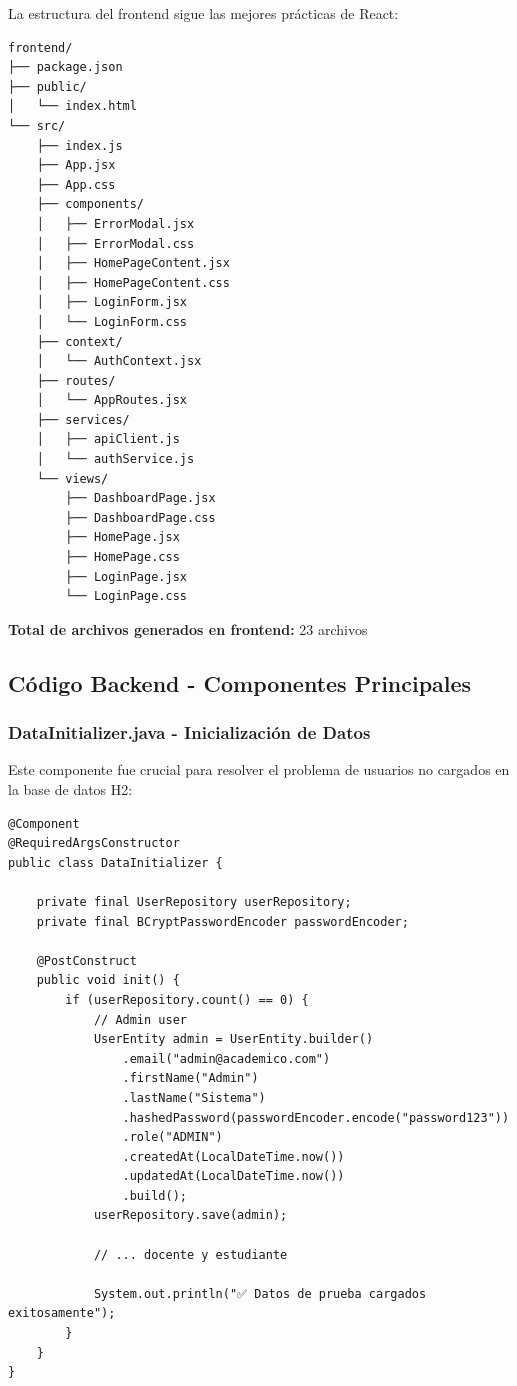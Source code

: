 \documentclass[11pt,a4paper]{article}
\begin{document}
La estructura del frontend sigue las mejores prácticas de React:

\begin{verbatim}
frontend/
├── package.json
├── public/
│   └── index.html
└── src/
    ├── index.js
    ├── App.jsx
    ├── App.css
    ├── components/
    │   ├── ErrorModal.jsx
    │   ├── ErrorModal.css
    │   ├── HomePageContent.jsx
    │   ├── HomePageContent.css
    │   ├── LoginForm.jsx
    │   └── LoginForm.css
    ├── context/
    │   └── AuthContext.jsx
    ├── routes/
    │   └── AppRoutes.jsx
    ├── services/
    │   ├── apiClient.js
    │   └── authService.js
    └── views/
        ├── DashboardPage.jsx
        ├── DashboardPage.css
        ├── HomePage.jsx
        ├── HomePage.css
        ├── LoginPage.jsx
        └── LoginPage.css
\end{verbatim}

\textbf{Total de archivos generados en frontend:} 23 archivos


\subsection{Código Backend - Componentes Principales}

\subsubsection{DataInitializer.java - Inicialización de Datos}

Este componente fue crucial para resolver el problema de usuarios no cargados en la base de datos H2:

\begin{verbatim}
@Component
@RequiredArgsConstructor
public class DataInitializer {
    
    private final UserRepository userRepository;
    private final BCryptPasswordEncoder passwordEncoder;
    
    @PostConstruct
    public void init() {
        if (userRepository.count() == 0) {
            // Admin user
            UserEntity admin = UserEntity.builder()
                .email("admin@academico.com")
                .firstName("Admin")
                .lastName("Sistema")
                .hashedPassword(passwordEncoder.encode("password123"))
                .role("ADMIN")
                .createdAt(LocalDateTime.now())
                .updatedAt(LocalDateTime.now())
                .build();
            userRepository.save(admin);
            
            // ... docente y estudiante
            
            System.out.println("✅ Datos de prueba cargados exitosamente");
        }
    }
}
\end{verbatim}
\end{document}
